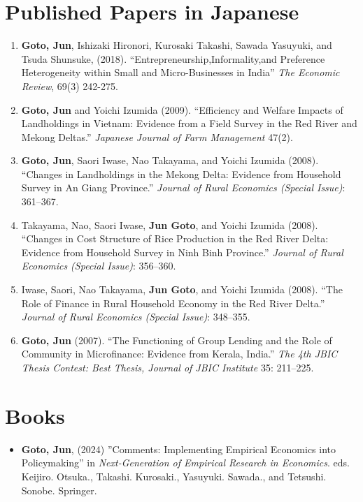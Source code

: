 \documentclass[12pt]{article}
\begin{document}
\section*{Published Papers in Japanese}
\begin{enumerate}
    \item \textbf{Goto, Jun}, Ishizaki Hironori, Kurosaki Takashi, Sawada Yasuyuki, and Tsuda Shunsuke, (2018). ``Entrepreneurship,Informality,and Preference Heterogeneity within Small and Micro-Businesses in India'' \textit{The Economic Review}, 69(3) 242-275. 

    \item \textbf{Goto, Jun} and Yoichi Izumida (2009). 
    ``Efficiency and Welfare Impacts of Landholdings in Vietnam: Evidence from a Field Survey in the Red River and Mekong Deltas.'' 
    \textit{Japanese Journal of Farm Management} 47(2).

    \item \textbf{Goto, Jun}, Saori Iwase, Nao Takayama, and Yoichi Izumida (2008). 
    ``Changes in Landholdings in the Mekong Delta: Evidence from Household Survey in An Giang Province.'' 
    \textit{Journal of Rural Economics (Special Issue)}: 361--367.

    \item Takayama, Nao, Saori Iwase, \textbf{Jun Goto}, and Yoichi Izumida (2008). 
    ``Changes in Cost Structure of Rice Production in the Red River Delta: Evidence from Household Survey in Ninh Binh Province.'' 
    \textit{Journal of Rural Economics (Special Issue)}: 356--360.

    \item Iwase, Saori, Nao Takayama, \textbf{Jun Goto}, and Yoichi Izumida (2008). 
    ``The Role of Finance in Rural Household Economy in the Red River Delta.'' 
    \textit{Journal of Rural Economics (Special Issue)}: 348--355.

    \item \textbf{Goto, Jun} (2007). 
    ``The Functioning of Group Lending and the Role of Community in Microfinance: Evidence from Kerala, India.'' 
    \textit{The 4th JBIC Thesis Contest: Best Thesis, Journal of JBIC Institute} 35: 211--225.
\end{enumerate}

\section*{Books}
\begin{itemize}
    \item \textbf{Goto, Jun}, (2024) ''Comments: Implementing Empirical Economics into Policymaking'' in \textit{Next-Generation of Empirical Research in Economics}. eds. Keijiro. Otsuka., Takashi. Kurosaki., Yasuyuki. Sawada., and Tetsushi. Sonobe. Springer. 
\end{itemize}
\end{document}
